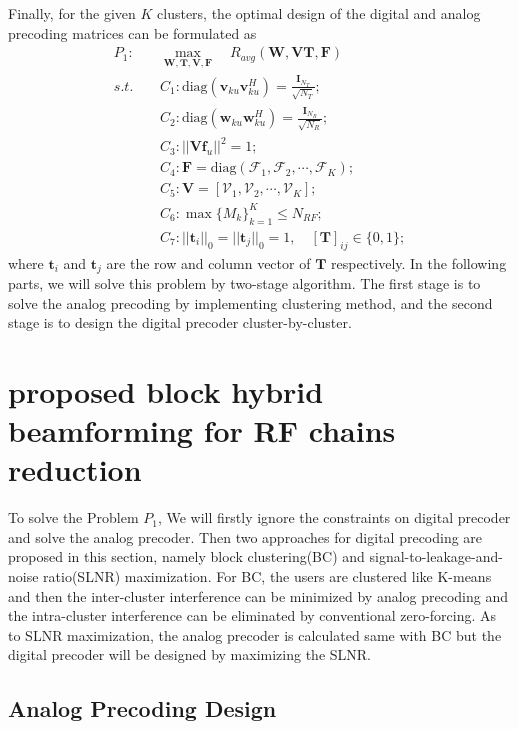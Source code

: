 \documentclass[conference]{IEEEtran}
\begin{document}
Finally, for the given $K$ clusters, the optimal design of the digital and analog precoding matrices can be formulated as
\begin{align}\label{eq:maxsumrate}
P_1: \quad&\max_{\bm W, \bm T, \bm{V},\bm F}\quad R_{avg}(\bm{W},\bm{VT},\bm{F})\\ \nonumber
s.t. \quad&C_1: \text{diag}(\bm{v}_{ku}\bm{v}_{ku}^H)=\frac{\bm{I}_{N_T}}{\sqrt{N_T}};\\
&C_2: \text{diag}(\bm{w}_{ku}\bm{w}_{ku}^H)=\frac{\bm{I}_{N_{R}}}{\sqrt{N_R}};\nonumber\\
&C_3: ||\bm{Vf}_u||^2=1;\nonumber\\
&C_4: \bm{F} = \text{diag}(\bm{\mathcal{F}}_1, \bm{\mathcal{F}}_2, \cdots, \bm{\mathcal{F}}_{K});\nonumber\\
&C_5: \bm{V} = [\bm{\mathcal{V}}_1, \bm{\mathcal{V}}_2, \cdots, \bm{\mathcal{V}}_K];\nonumber\\
&C_6: \max \{M_k\}_{k=1}^K \leq N_{RF};\nonumber\\
&C_7: ||\bm{t}_{i}||_0=||\bm{t}_{j}||_0=1, \quad [\bm{T}]_{ij}\in\{0,1\};\nonumber
\end{align}
where $\bm{t}_{i}$ and $\bm{t}_{j}$ are the row and column vector of $\bm{T}$ respectively. In the following parts, we will solve this problem by two-stage algorithm. The first stage is to solve the analog precoding by implementing clustering method, and the second stage is to design the digital precoder cluster-by-cluster.



\section{proposed block hybrid beamforming for RF chains reduction}
To solve the Problem $P_1$, We will firstly ignore the constraints on digital precoder and solve the analog precoder. Then two approaches for digital precoding are proposed in this section, namely block clustering(BC) and signal-to-leakage-and-noise ratio(SLNR) maximization. For BC, the users are clustered like K-means and then the inter-cluster interference can be minimized by analog precoding and the intra-cluster interference can be eliminated by conventional zero-forcing. As to SLNR maximization, the analog precoder is calculated same with BC but the digital precoder will be designed by maximizing the SLNR.

\subsection{Analog Precoding Design}
\end{document}
